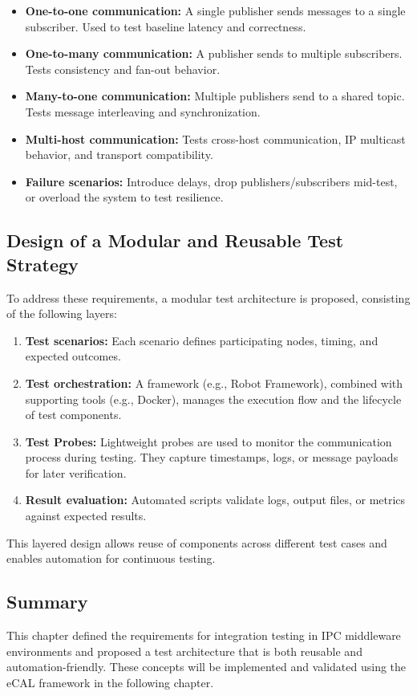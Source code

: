 \begin{itemize}
	\item \textbf{One-to-one communication:} A single publisher sends messages to a single subscriber. Used to test baseline latency and correctness.
	
	\item \textbf{One-to-many communication:} A publisher sends to multiple subscribers. Tests consistency and fan-out behavior.
	
	\item \textbf{Many-to-one communication:} Multiple publishers send to a shared topic. Tests message interleaving and synchronization.
	
	\item \textbf{Multi-host communication:} Tests cross-host communication, IP multicast behavior, and transport compatibility.
	
	\item \textbf{Failure scenarios:} Introduce delays, drop publishers/subscribers mid-test, or overload the system to test resilience.
\end{itemize}

\subsection{Design of a Modular and Reusable Test Strategy}

To address these requirements, a modular test architecture is proposed, consisting of the following layers:

\begin{enumerate}
	\item \textbf{Test scenarios:} Each scenario defines participating nodes, timing, and expected outcomes.
	\item \textbf{Test orchestration:} A framework (e.g., Robot Framework), combined with supporting tools (e.g., Docker), manages the execution flow and the lifecycle of test components.
	\item \textbf{Test Probes:} Lightweight probes are used to monitor the communication process during testing. They capture timestamps, logs, or message payloads for later verification.
	\item \textbf{Result evaluation:} Automated scripts validate logs, output files, or metrics against expected results.
\end{enumerate}

This layered design allows reuse of components across different test cases and enables automation for continuous testing.

\subsection{Summary}

This chapter defined the requirements for integration testing in IPC middleware environments and proposed a test architecture that is both reusable and automation-friendly. These concepts will be implemented and validated using the eCAL framework in the following chapter.


